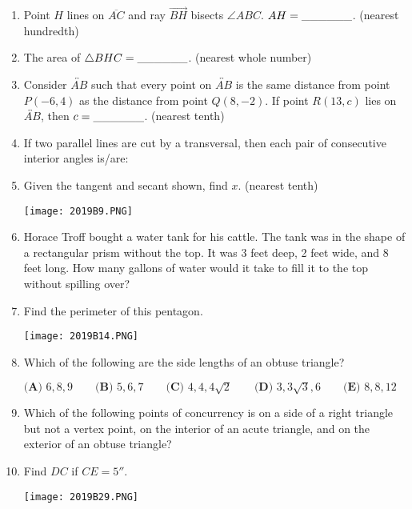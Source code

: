 \documentclass[../uilmath.tex]{subfiles}
\begin{document}
\begin{enumerate}[label=\bfseries\arabic*.]
    \item %
    Point $H$ lines on $\overline{AC}$ and ray $\overrightarrow{BH}$ bisects $\angle ABC$. $AH=\_\_\_\_\_\_$. (nearest hundredth)

    \item %
    The area of $\triangle BHC=\_\_\_\_\_\_$. (nearest whole number)

    \item %
    Consider $\overleftrightarrow{AB}$ such that every point on $\overleftrightarrow{AB}$ is the same distance from point $P(-6,4)$ as the distance from point $Q(8,-2)$. If point $R(13,c)$ lies on $\overleftrightarrow{AB}$, then $c=\_\_\_\_\_\_$. (nearest tenth)

    \item %
    If two parallel lines are cut by a transversal, then each pair of consecutive interior angles is/are:

    \item %
    Given the tangent and secant shown, find $x$. (nearest tenth)
    \begin{center}
        \texttt{[image: 2019B9.PNG]}
    \end{center}

    \item %
    Horace Troff bought a water tank for his cattle. The tank was in the shape of a rectangular prism without the top. It was 3 feet deep, 2 feet wide, and 8 feet long. How many gallons of water would it take to fill it to the top without spilling over?

    \item %
    Find the perimeter of this pentagon.
    \begin{center}
        \texttt{[image: 2019B14.PNG]}
    \end{center}

    \item %
    Which of the following are the side lengths of an obtuse triangle?

    $\textbf{(A) } 6,8,9 \qquad \textbf{(B) } 5,6,7 \qquad \textbf{(C) }4,4,4\sqrt{2}\qquad \textbf{(D) } 3,3\sqrt{3},6\qquad \textbf{(E) } 8,8,12$

    \item %
    Which of the following points of concurrency is on a side of a right triangle but not a vertex point, on the interior of an acute triangle, and on the exterior of an obtuse triangle? 

    \item %
    Find $DC$ if $CE=5''$.
    \begin{center}
        \texttt{[image: 2019B29.PNG]}
    \end{center}


\end{enumerate}
\end{document}
